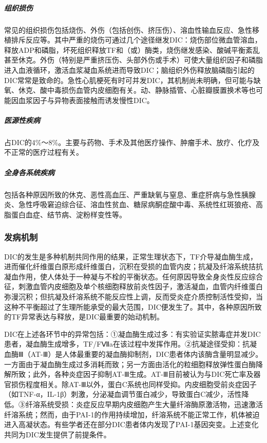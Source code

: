 \subparagraph{组织损伤}

常见的组织损伤包括烧伤、外伤（包括创伤、挤压伤）、溶血性输血反应、急性移植排斥反应等。其中严重的烧伤可通过几个途径继发DIC：烧伤部位微血管溶血，释放ADP和磷脂，坏死组织释放TF和（或）酶类，烧伤继发感染、酸碱平衡紊乱甚至休克。外伤（特别是严重挤压伤、头部外伤或手术）可使大量组织因子和磷脂进入血液循环，激活血浆凝血系统进而导致DIC；脑组织外伤释放脑磷脂引起的DIC常常是致命的。急性心肌梗死有时可并发DIC，其机制尚未明确，但可能与缺氧、休克、酸中毒损伤血管内皮细胞有关。动、静脉插管、心脏瓣膜置换术等也可能因血浆因子与异物表面接触而诱发慢性DIC。

\subparagraph{医源性疾病}

占DIC的4\%～8\%。主要与药物、手术及其他医疗操作、肿瘤手术、放疗、化疗及不正常的医疗过程有关。

\subparagraph{全身各系统疾病}

包括各种原因所致的休克、恶性高血压、严重缺氧与窒息、重症肝病与急性胰腺炎、急性呼吸窘迫综合征、溶血性贫血、糖尿病酮症酸中毒、系统性红斑狼疮、高脂蛋白血症、结节病、淀粉样变性等。

\subsubsection{发病机制}

DIC的发生是多种机制共同作用的结果，正常生理状态下，TF介导凝血酶生成，进而催化纤维蛋白原形成纤维蛋白，沉积在受损的血管内皮；抗凝及纤溶系统拮抗凝血作用，使人体处于一种凝与不栓的平衡状态。任何原因导致全身炎性反应综合征，刺激血管内皮细胞及单个核细胞释放前炎性因子，激活凝血，血管内纤维蛋白弥漫沉积；但抗凝及纤溶系统不能反应性上调，反而受炎症介质控制活性受抑，当这种不平衡超过了生理所能承受的最大范围，DIC便发生了。其中，各种原因所致的TF异常表达与释放，是DIC最重要的始动机制。

DIC在上述各环节中的异常包括：①凝血酶生成过多：有实验证实脓毒症并发DIC患者，凝血酶生成增多，TF/FⅦa在该过程中发挥作用。②抗凝途径受抑：抗凝血酶Ⅲ（AT-Ⅲ）是人体最重要的凝血酶抑制剂，DIC患者体内该酶含量明显减少。一方面由于凝血酶生成过多消耗而致；另一方面由活化的粒细胞释放弹性蛋白酶降解所致；此外，各种炎症因子抑制AT-Ⅲ生成。AT-Ⅲ目前被认为与DIC死亡率及器官损伤程度相关。除AT-Ⅲ以外，蛋白C系统也同样受抑。内皮细胞受前炎症因子（如TNF-α，IL-1β）刺激，分泌凝血调节蛋白减少，导致蛋白C减少，活性降低。③纤溶系统受损：炎症反应早期内皮细胞产生大量纤溶酶原激活物，迅速激活纤溶系统；然而，由于PAI-1的作用持续增加，纤溶系统不能正常工作，机体被迫进入高凝状态。有些学者还在部分DIC患者体内发现了PAI-1基因突变。上述变化共同为DIC发生提供了前提条件。

